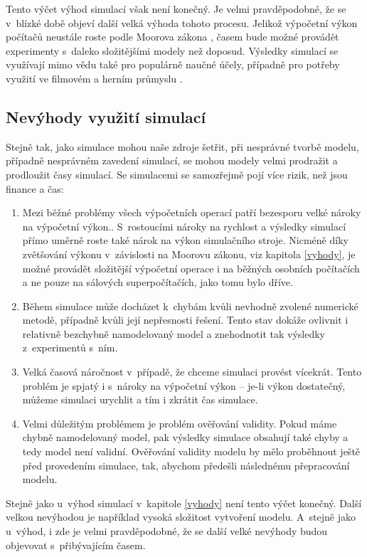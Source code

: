 Tento výčet výhod simulací však není konečný. Je velmi pravděpodobné, že se v~blízké době objeví další velká výhoda tohoto procesu. Jelikož výpočetní výkon počítačů neustále roste podle Moorova zákona \cite{Schaller1997}, časem bude možné provádět experimenty s~daleko složitějšími modely než doposud. Výsledky simulací se využívají mimo vědu také pro populárně naučné účely, případně pro potřeby využití ve filmovém a herním průmyslu \cite{James_2015}.

\subsection{Nevýhody využití simulací}

Stejně tak, jako simulace mohou naše zdroje šetřit, při nesprávné tvorbě modelu, případně nesprávném zavedení simulací, se mohou modely velmi prodražit a prodloužit časy simulací. Se simulacemi se samozřejmě pojí více rizik, než jsou finance a čas:

\begin{enumerate}
    \item Mezi běžné problémy všech výpočetních operací patří bezesporu velké nároky na výpočetní výkon.. S~rostoucími nároky na rychlost a výsledky simulací přímo uměrně roste také nárok na výkon simulačního stroje. Nicméně díky zvětšování výkonu v~závislosti na Moorovu zákonu, viz kapitola \ref{vyhody}, je možné provádět složitější výpočetní operace i na běžných osobních počítačích a ne pouze na sálových superpočítačích, jako tomu bylo dříve.
    \item Během simulace může docházet k~chybám kvůli nevhodně zvolené numerické metodě, případně kvůli její nepřesnosti řešení. Tento stav dokáže ovlivnit i relativně bezchybně namodelovaný model a znehodnotit tak výsledky z~experimentů s~ním.
    \item Velká časová náročnost v~případě, že chceme simulaci provést vícekrát. Tento problém je spjatý i s~nároky na výpočetní výkon -- je-li výkon dostatečný, můžeme simulaci urychlit a tím i zkrátit čas simulace.
    \item Velmi důležitým problémem je problém ověřování validity. Pokud máme chybně namodelovaný model, pak výsledky simulace obsahují také chyby a tedy model není validní. Ověřování validity modelu by mělo proběhnout ještě před provedením simulace, tak, abychom předešli následnému přepracování modelu.
\end{enumerate}

Stejně jako u~výhod simulací v~kapitole \ref{vyhody} není tento výčet konečný. Další velkou nevýhodou je například vysoká složitost vytvoření modelu. A~stejně jako u~výhod, i zde je velmi pravděpodobné, že se další velké nevýhody budou objevovat s~přibývajícím časem.

